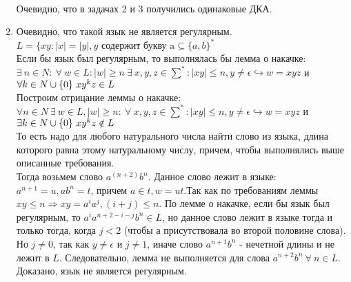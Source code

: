 \documentclass[10pt]{amsart}
\theoremstyle{plain}
\theoremstyle{remark}
\theoremstyle{definition}
\begin{document}
\begin{enumerate}
        \begin{figure}[h]
\end{figure}\\    \newpage
Очевидно, что в задачах 2 и 3 получились одинаковые ДКА.
\item Очевидно, что такой язык не является регулярным. $L=\{xy:|x|=|y|, y \text{ содержит букву a}\subseteq\{a,b\}^*$\\
Если бы язык был регулярным, то выполнялась бы лемма о накачке:\\
$\exists~ n\in N:~\forall~w \in L:|w|\geqslant n ~\exists~ x,y,z \in \sum^*: |xy|\leqslant n , y \neq \epsilon \hookrightarrow w = xyz$ и $\forall k\in N\cup\{\small0\small\} ~xy^kz \in L$\\
Построим отрицание леммы о накачке:\\
$\forall n\in N~ \exists~ w \in L, |w|\geqslant n: ~\forall~ x,y,z \in \sum^*: |xy|\leqslant n , y \neq \epsilon \hookrightarrow w = xyz$ и $\exists k\in N\cup\small\{0\small\} ~xy^kz \notin L$\\
То есть надо для любого натурального числа найти слово из языка, длина которого равна этому натуральному числу, причем, чтобы выполнялись выше описанные требования.\\
Тогда возьмем слово $a^(n+2)b^n$. Данное слово лежит в языке: $a^{n+1} = u, ab^n = t$, причем $a\in t, w = ut$.Так как по требованиям леммы $xy \leqslant n\Rightarrow xy = a^ia^j, (i+j)\leqslant n$. По лемме о накачке, если бы язык был регулярным, то $a^ia^{n+2-i-j}b^n \in L$, но данное слово лежит в языке тогда и только тогда, когда $j < 2 $ (чтобы а присутствовала во второй половине слова). Но $j \neq 0$, так как $y \neq \epsilon$ и $j \neq 1$, иначе слово $a^{n+1}b^n$ - нечетной длины и не лежит в $L$. Следовательно, лемма не выполняется для слова $a^{n+2}b^n ~\forall ~n \in L$. Доказано, язык не является регулярным.
\end{enumerate}
\end{document}

